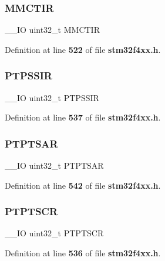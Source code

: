 \subsubsection{M\+M\+C\+T\+IR}
{\footnotesize\ttfamily \+\_\+\+\_\+\+IO uint32\+\_\+t M\+M\+C\+T\+IR}



Definition at line \textbf{ 522} of file \textbf{ stm32f4xx.\+h}.

\mbox{\label{structETH__TypeDef_af34b7e8815984e272daa3f089014af4e}} 
\subsubsection{P\+T\+P\+S\+S\+IR}
{\footnotesize\ttfamily \+\_\+\+\_\+\+IO uint32\+\_\+t P\+T\+P\+S\+S\+IR}



Definition at line \textbf{ 537} of file \textbf{ stm32f4xx.\+h}.

\mbox{\label{structETH__TypeDef_a8f47c0f21e22b98bbc2c9f3b6342fbb8}} 
\subsubsection{P\+T\+P\+T\+S\+AR}
{\footnotesize\ttfamily \+\_\+\+\_\+\+IO uint32\+\_\+t P\+T\+P\+T\+S\+AR}



Definition at line \textbf{ 542} of file \textbf{ stm32f4xx.\+h}.

\mbox{\label{structETH__TypeDef_aa657aa42398bc8294976632d778b6db4}} 
\subsubsection{P\+T\+P\+T\+S\+CR}
{\footnotesize\ttfamily \+\_\+\+\_\+\+IO uint32\+\_\+t P\+T\+P\+T\+S\+CR}



Definition at line \textbf{ 536} of file \textbf{ stm32f4xx.\+h}.

